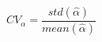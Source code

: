 \begin{equation}
CV_{\alpha} = \frac{std(\hat{\alpha})}{mean(\hat{\alpha})}
\label{eq:cvadef}
\end{equation}